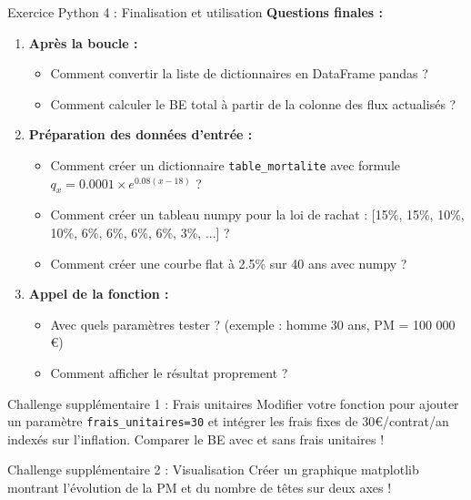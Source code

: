 \documentclass[10pt,aspectratio=169]{beamer}
\begin{document}
\begin{frame}{Exercice Python 4 : Finalisation et utilisation}
\textbf{Questions finales :}

\begin{enumerate}
    \item \textbf{Après la boucle :}
    \begin{itemize}
        \item Comment convertir la liste de dictionnaires en DataFrame pandas ?
        \item Comment calculer le BE total à partir de la colonne des flux actualisés ?
    \end{itemize}
    
    \item \textbf{Préparation des données d'entrée :}
    \begin{itemize}
        \item Comment créer un dictionnaire \texttt{table\_mortalite} avec formule $q_x = 0.0001 \times e^{0.08(x-18)}$ ?
        \item Comment créer un tableau numpy pour la loi de rachat : [15\%, 15\%, 10\%, 10\%, 6\%, 6\%, 6\%, 6\%, 3\%, ...] ?
        \item Comment créer une courbe flat à 2.5\% sur 40 ans avec numpy ?
    \end{itemize}
    
    \item \textbf{Appel de la fonction :}
    \begin{itemize}
        \item Avec quels paramètres tester ? (exemple : homme 30 ans, PM = 100 000 €)
        \item Comment afficher le résultat proprement ?
    \end{itemize}
\end{enumerate}

\begin{alertblock}{Challenge supplémentaire 1 : Frais unitaires}
Modifier votre fonction pour ajouter un paramètre \texttt{frais\_unitaires=30} et intégrer les frais fixes de 30€/contrat/an indexés sur l'inflation. Comparer le BE avec et sans frais unitaires !
\end{alertblock}

\begin{alertblock}{Challenge supplémentaire 2 : Visualisation}
Créer un graphique matplotlib montrant l'évolution de la PM et du nombre de têtes sur deux axes !
\end{alertblock}
\end{frame}
\end{document}
